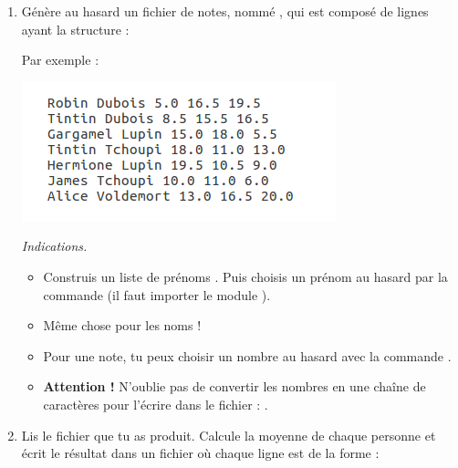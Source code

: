 \documentclass[11pt,class=report,crop=false]{standalone}
\begin{document}
\begin{activite}


\begin{enumerate}
  \item Génère au hasard un fichier de notes, nommé , qui est composé de lignes ayant la structure :
  
  \centerline{} 
  
  Par exemple :
\begin{center}
\includegraphics[scale=\myscale,scale=0.7]{ecran-fichiers-1a}
\end{center} 

  \emph{Indications.}
  \begin{itemize}
    	\item Construis un liste de prénoms . Puis choisis un prénom au hasard par la commande
    	 (il faut importer le module ).
    	
    	\item Même chose pour les noms ! 
    	
    	\item Pour une note, tu peux choisir un nombre au hasard avec la commande  . 
    	
    	\item \textbf{Attention !} N'oublie pas de convertir les nombres en une chaîne de caractères pour l'écrire dans le fichier : .
    	
   \end{itemize}
    
  
  \item Lis le fichier  que tu as produit. Calcule la moyenne de chaque personne et écrit le résultat dans un fichier  où chaque ligne est de la forme :
  
  \centerline{} 
  

\end{enumerate}
\end{activite}
\end{document}
